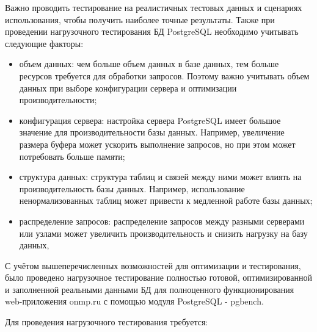 Важно проводить тестирование на реалистичных тестовых данных и сценариях использования, чтобы получить наиболее точные результаты. Также при проведении нагрузочного тестирования БД PostgreSQL необходимо учитывать следующие факторы:

\begin{itemize}
    \item объем данных: чем больше объем данных в базе данных, тем больше ресурсов требуется для обработки запросов. Поэтому важно учитывать объем данных при выборе конфигурации сервера и оптимизации производительности;
    \item конфигурация сервера: настройка сервера PostgreSQL имеет большое значение для производительности базы данных. Например, увеличение размера буфера может ускорить выполнение запросов, но при этом может потребовать больше памяти;
    \item структура данных: структура таблиц и связей между ними может влиять на производительность базы данных. Например, использование ненормализованных таблиц может привести к медленной работе базы данных;
    \item распределение запросов: распределение запросов между разными серверами или узлами может увеличить производительность и снизить нагрузку на базу данных,
\end{itemize}

С учётом вышеперечисленных возможностей для оптимизации и тестирования, было проведено нагрузочное тестирование полностью готовой, оптимизированной и заполненной реальными данными БД для полноценного функционирования web-приложения onmp.ru с помощью модуля PostgreSQL - pgbench.

Для проведения нагрузочного тестирования требуется:

